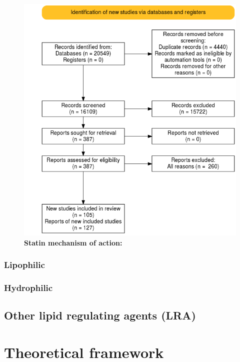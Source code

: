 \documentclass[a4paper, twoside]{templates/ociamthesis}
\begin{document}
\begin{figure}
\includegraphics[width=1\linewidth]{figures/sys-rev/prisma_flow} \caption[Statin mechanism of action]{\textbf{Statin mechanism of action:}}\label{fig:statin-mechanisam}
\end{figure}

\hypertarget{lipophilic}{%
\subsubsection{Lipophilic}\label{lipophilic}}

\hypertarget{hydrophilic}{%
\subsubsection{Hydrophilic}\label{hydrophilic}}

\hypertarget{other-lipid-regulating-agents-lra}{%
\subsection{Other lipid regulating agents (LRA)}\label{other-lipid-regulating-agents-lra}}

\hypertarget{theoretical-framework}{%
\section{Theoretical framework}\label{theoretical-framework}}
\end{document}
